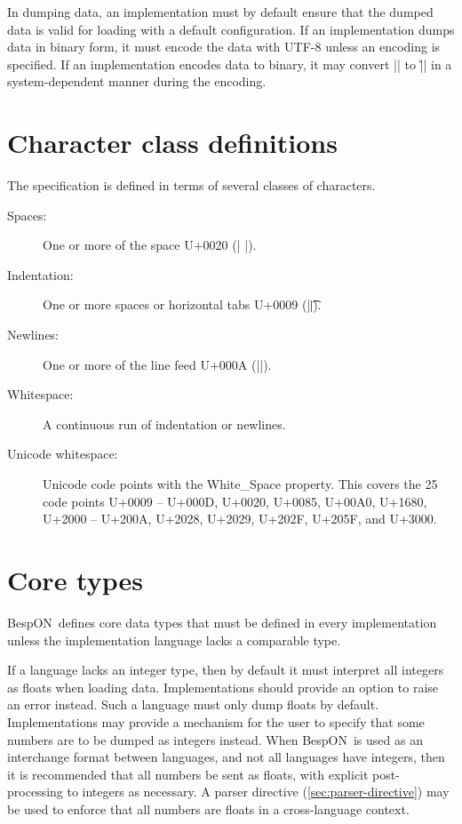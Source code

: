 \documentclass[11pt]{article}
\newcommand{\bespon}{BespON}
\begin{document}
In dumping data, an implementation must by default ensure that the dumped data is valid for loading with a default configuration.  If an implementation dumps data in binary form, it must encode the data with UTF-8 unless an encoding is specified.  If an implementation encodes data to binary, it may convert |\n| to |\r\n| in a system-dependent manner during the encoding.




\section{Character class definitions}
The specification is defined in terms of several classes of characters.
\begin{description}
\item[Spaces:]  One or more of the space U+0020 \begingroup{}(| |)\endgroup.
\item[Indentation:]  One or more spaces or horizontal tabs U+0009 (|\t|).
\item[Newlines:]  One or more of the line feed U+000A (|\n|).
\item[Whitespace:]  A continuous run of indentation or newlines.
\item[Unicode whitespace:]  Unicode code points with the White\_Space property.  This covers the 25 code points U+0009 -- U+000D, U+0020, U+0085, U+00A0, U+1680, U+2000 -- U+200A, U+2028, U+2029, U+202F, U+205F, and U+3000.
\end{description}





\section{Core types}

\bespon\ defines core data types that must be defined in every implementation unless the implementation language lacks a comparable type.

If a language lacks an integer type, then by default it must interpret all integers as floats when loading data.  Implementations should provide an option to raise an error instead.  Such a language must only dump floats by default.  Implementations may provide a mechanism for the user to specify that some numbers are to be dumped as integers instead.  When \bespon\ is used as an interchange format between languages, and not all languages have integers, then it is recommended that all numbers be sent as floats, with explicit post-processing to integers as necessary.  A parser directive (\cref{sec:parser-directive}) may be used to enforce that all numbers are floats in a cross-language context.
\end{document}

